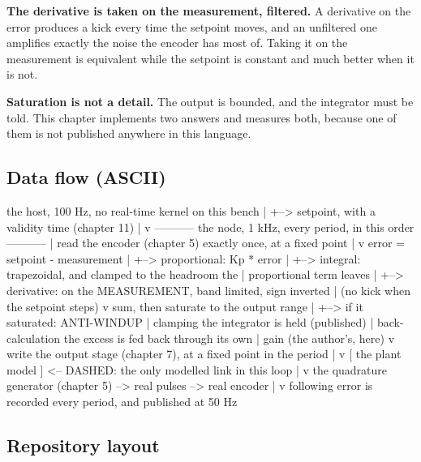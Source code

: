 \textbf{The derivative is taken on the measurement, filtered.} A derivative on
the error produces a kick every time the setpoint moves, and an unfiltered one
amplifies exactly the noise the encoder has most of. Taking it on the
measurement is equivalent while the setpoint is constant and much better when it
is not.

\textbf{Saturation is not a detail.} The output is bounded, and the integrator
must be told. This chapter implements two answers and measures both, because one
of them is not published anywhere in this language.

\subsection*{Data flow (ASCII)}

\begin{asciiart}
  the host, 100 Hz, no real-time kernel on this bench
        |
        +--> setpoint, with a validity time (chapter 11)
                 |
                 v
  ----------- the node, 1 kHz, every period, in this order -----------
        |
        read the encoder (chapter 5)      exactly once, at a fixed point
        |
        v
      error = setpoint - measurement
        |
        +--> proportional:  Kp * error
        |
        +--> integral:      trapezoidal, and clamped to the headroom the
        |                   proportional term leaves
        |
        +--> derivative:    on the MEASUREMENT, band limited, sign inverted
        |                          (no kick when the setpoint steps)
        v
      sum, then saturate to the output range
        |
        +--> if it saturated: ANTI-WINDUP
        |        clamping        the integrator is held           (published)
        |        back-calculation the excess is fed back through its own
        |                        gain                  (the author's, here)
        v
      write the output stage (chapter 7), at a fixed point in the period
        |
        v
      [ the plant model ]  <-- DASHED: the only modelled link in this loop
        |
        v
      the quadrature generator (chapter 5) --> real pulses --> real encoder
        |
        v
      following error is recorded every period, and published at 50 Hz
\end{asciiart}

\subsection*{Repository layout}

